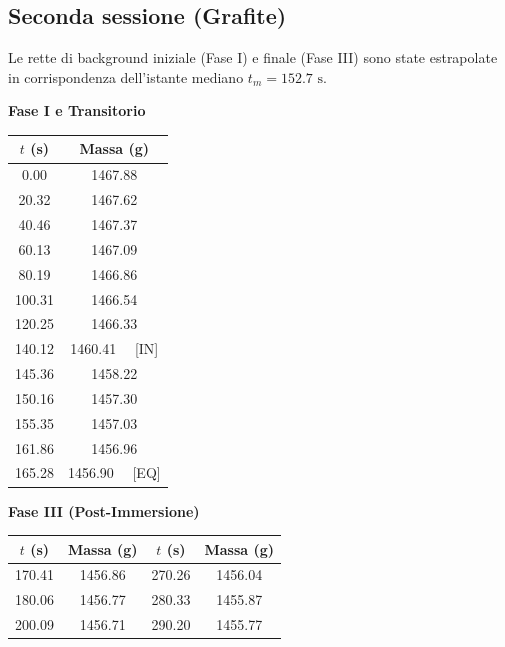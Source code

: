 \documentclass[a4paper,12pt]{article}
\begin{document}
\subsection{Seconda sessione (Grafite)}
Le rette di background iniziale (Fase I) e finale (Fase III) sono state estrapolate in corrispondenza dell'istante mediano $t_m = 152.7\text{ s}$.
\begin{table}[htbp]
    \centering
    \footnotesize
    \noindent
    \begin{minipage}[t]{0.42\textwidth}
        \centering
        \textbf{Fase I e Transitorio} \\
        \vspace{0.2cm}
        \begin{tabular}{cc}
            \hline
            $t$ (s) & Massa (g) \\ \hline
            0.00 & 1467.88 \\
            20.32 & 1467.62 \\
            40.46 & 1467.37 \\
            60.13 & 1467.09 \\
            80.19 & 1466.86 \\
            100.31 & 1466.54 \\
            120.25 & 1466.33 \\
            140.12 & 1460.41 \ \ [IN] \\
            145.36 & 1458.22 \\
            150.16 & 1457.30 \\
            155.35 & 1457.03 \\
            161.86 & 1456.96 \\
            165.28 & 1456.90 \ \ [EQ] \\ \hline
        \end{tabular}
    \end{minipage}
    \hfill
    \begin{minipage}[t]{0.54\textwidth}
        \centering
        \textbf{Fase III (Post-Immersione)} \\
        \vspace{0.2cm}
        \begin{tabular}{cc|cc}
            \hline
            $t$ (s) & Massa (g) & $t$ (s) & Massa (g) \\ \hline
            170.41 & 1456.86 & 270.26 & 1456.04 \\
            180.06 & 1456.77 & 280.33 & 1455.87 \\
            200.09 & 1456.71 & 290.20 & 1455.77 \\

\end{tabular}
\end{minipage}
\end{table}
\end{document}
